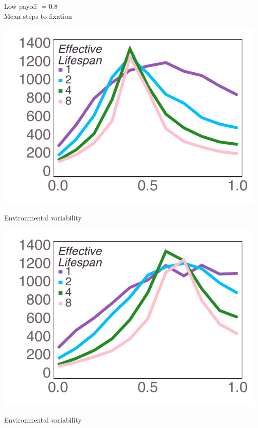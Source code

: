 \documentclass[varwidth=true,crop=false]{standalone}
\begin{document}
    \begin{minipage}{3.75in}
    \begin{rotate}{90}
      {\parbox{3.0in}{
          \centering
          \vspace{-1.0em}\hspace{-2.5em} {\huge Low payoff $ = 0.8$} \\[1em]
          {\huge Mean steps to fixation}
      }}
    \end{rotate}%
    \hspace{2em}
      \includegraphics[width=\textwidth]{Figures/step_over_u_lowpayoff=0.8_nbehaviors=2.pdf}
        \\[-2.75em]
        \begin{center}
          {\hspace{3.25em} \huge Environmental variability}
      \end{center}
	  \end{minipage}\noindent\hspace{1.25em}
		\begin{minipage}{3.75in}%
		  \includegraphics[width=\textwidth]{Figures/step_over_u_lowpayoff=0.8_nbehaviors=4.pdf}
		  \\[-2.75em]
	  \begin{center}
          {\hspace{3.25em} \huge Environmental variability}
      \end{center}
    \end{minipage}
\end{document}
